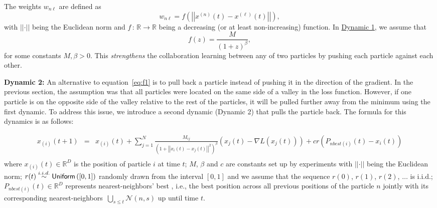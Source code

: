 \documentclass[fleqn,10pt]{wlscirep}
\begin{document}
The weights $w_{n\ell}$ are defined as
\begin{equation}
w_{n\ell}= f\left(\left|\left|x^{(n)}(t)-x^{(\ell)}(t)\right|\right|\right),
\end{equation}
with $\left|\left|\cdot\right|\right|$ being the Euclidean norm and $f\,:\,\mathbb{R}\rightarrow \mathbb{R}$ being a decreasing (or at least non-increasing) function. In \underline{Dynamic 1}, we assume that
\begin{equation}
f(z)= \frac{M}{\left(1+z\right)^{\beta}},
\end{equation}
for some constants $M,\beta>0$. This \emph{strengthens} the collaboration learning between any of two particles by pushing each particle against each other.



\textbf{Dynamic 2:} An alternative to equation~\eqref{eq:f1} is to pull back a particle instead of pushing it in the direction of the gradient. In the previous section, the assumption was that all particles were located on the same side of a valley in the loss function. However, if one particle is on the opposite side of the valley relative to the rest of the particles, it will be pulled further away from the minimum using the first dynamic. To address this issue, we introduce a second dynamic (Dynamic 2) that pulls the particle back. The formula for this dynamics is as follows:

\begin{equation}
\begin{array}{ccl}
x_{(i)}(t+1) & = & x_{(i)}(t)
+ \sum_{j=1}^N \frac{M_{ij}}{(1+\left|\left|x_i(t)-x_j(t)\right|\right|^2)^\beta} (x_j(t)
- \nabla L(x_j(t)))
+ c r\left(P_{nbest(i)}(t)-x_{i}(t)\right) \\
\end{array} 
\label{eq:f2}
\end{equation}
where $x_{(i)}(t)\in\mathbb{R}^{D}$ is the position of particle $i$ at time $t$; $M$, $\beta$ and $c$ are constants set up by experiments with $\left|\left|\cdot\right|\right|$ being the Euclidean norm; $r(t)\overset{i.i.d.}\sim {\sf Uniform}\left(\left[0,1\right]\right)$ randomly drawn from the interval $\left[0,1\right]$ and we assume that the sequence $r(0)$, $r(1)$, $r(2)$, $\ldots$ is i.i.d.; $P_{nbest(i)}(t)\in\mathbb{R}^D$ represents nearest-neighbors' best , i.e., the best position across all previous positions of the particle $n$ jointly with its corresponding nearest-neighbors~$\bigcup_{s\leq t} \mathcal{N}\left(n,s\right)$ up until time $t$.
\end{document}

